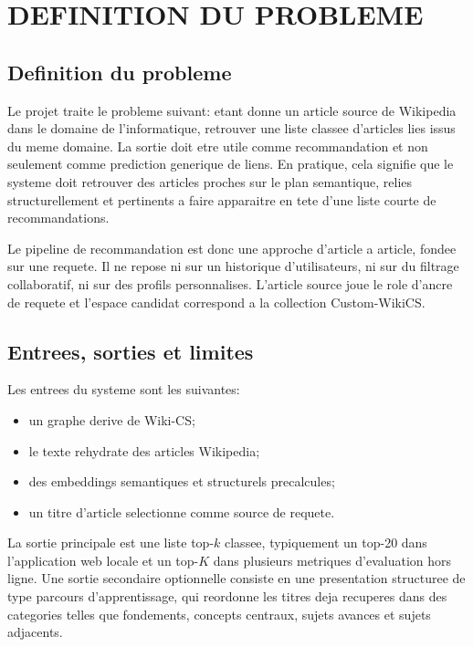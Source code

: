 \chapter{DEFINITION DU PROBLEME}
\thispagestyle{empty}

\section{Definition du probleme}

Le projet traite le probleme suivant: etant donne un article source de
Wikipedia dans le domaine de l'informatique, retrouver une liste classee
d'articles lies issus du meme domaine. La sortie doit etre utile comme
recommandation et non seulement comme prediction generique de liens. En
pratique, cela signifie que le systeme doit retrouver des articles proches sur
le plan semantique, relies structurellement et pertinents a faire apparaitre en
tete d'une liste courte de recommandations.

Le pipeline de recommandation est donc une approche d'article a article, fondee
sur une requete. Il ne repose ni sur un historique d'utilisateurs, ni sur du
filtrage collaboratif, ni sur des profils personnalises. L'article source joue
le role d'ancre de requete et l'espace candidat correspond a la collection
Custom-WikiCS.

\section{Entrees, sorties et limites}

Les entrees du systeme sont les suivantes:
\begin{itemize}
    \item un graphe derive de Wiki-CS;
    \item le texte rehydrate des articles Wikipedia;
    \item des embeddings semantiques et structurels precalcules;
    \item un titre d'article selectionne comme source de requete.
\end{itemize}

La sortie principale est une liste top-$k$ classee, typiquement un top-20 dans
l'application web locale et un top-$K$ dans plusieurs metriques d'evaluation
hors ligne. Une sortie secondaire optionnelle consiste en une presentation
structuree de type parcours d'apprentissage, qui reordonne les titres deja
recuperes dans des categories telles que fondements, concepts centraux, sujets
avances et sujets adjacents.

